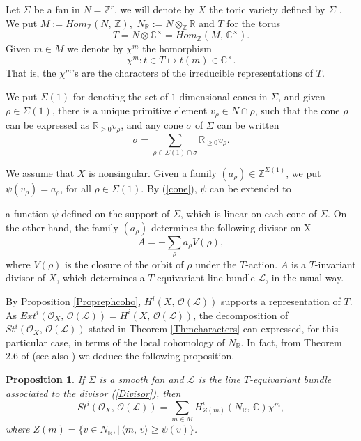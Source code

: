 \documentclass[xypic,amscd,syntonly,amssymb,verbatim,12pt]{amsart}
\theoremstyle{plain}
\newtheorem{Prop}[Thm]{Proposition}
\theoremstyle{definition}
\theoremstyle{remark}
\numberwithin{equation}{section}
\begin{document}
Let $\Sigma$ be a fan in $N={\mathbb Z}^r$, we will denote by $X$
the toric variety defined by $\Sigma$ \cite{C-K,C-L-S,Fulton,Oda}.
We put $M:=Hom_{\mathbb Z}(N,\,{\mathbb Z}),$ $N_{\mathbb
R}:=N\otimes_{\mathbb Z}{\mathbb R}$ and $T$ for the torus
$$T=N\otimes{\mathbb C}^{\times}=Hom_{\mathbb Z}(M,\,{\mathbb
C}^{\times}).$$
  Given $m\in M$ we denote by $\chi^m$ the homorphism
$$\chi^m:t\in T\mapsto t(m)\in {\mathbb C}^{\times}.$$
 That is, the $\chi^m$'s are the characters of the irreducible representations of $T$.

 We put $\Sigma(1)$ for denoting
the set of $1$-dimensional cones in $\Sigma$, and given $\rho\in
\Sigma(1)$, there is a unique primitive element $v_{\rho}\in N\cap
\rho$, such that the cone $\rho$ can be expressed as ${\mathbb
R}_{\geq 0}v_{\rho}$, and any cone $\sigma$ of $\Sigma$ can be
written
 \begin{equation}\label{cone}
 \sigma=\sum_{\rho\in\Sigma(1)\cap\sigma}{\mathbb
R}_{\geq 0}v_{\rho}.
\end{equation}

We assume that $X$ is nonsingular. Given a family $(a_{\rho})\in
{\mathbb Z}^{\Sigma(1)}$, we put $\psi(v_{\rho})=a_{\rho}$, for
all $\rho\in\Sigma(1)$. By (\ref{cone}), $\psi$ can be extended to
 
 
  a  function $\psi$ defined on the
support of $\Sigma$, which is linear on each cone of $\Sigma$. On
the other hand, the family $(a_{\rho})$ determines the following
divisor on X
 \begin{equation}\label{Divisor}
 A=-\sum_{\rho}a_{\rho}V(\rho),
  \end{equation}
where $V({\rho})$ is the closure of the orbit of $\rho$ under the
$T$-action. $A$ is a $T$-invariant divisor of $X$, which
determines a $T$-equivariant line bundle ${\mathcal L}$, in the
usual way.

By Proposition \ref{Proprephcoho},
$H^i(X,\,{\mathcal O}({\mathcal L}))$ supports a representation of
$T$. As $Ext^i({\mathcal O}_X,\,{\mathcal O}({\mathcal L}))=
H^i(X,\,{\mathcal O}({\mathcal L}))$, the decomposition of
$St^i({\mathcal O}_X,\, {\mathcal O}({\mathcal
L}))$
 stated in Theorem
\ref{Thmcharacters} can expressed, for this particular case, in
terms of the local cohomology of $N_{\mathbb R}$. In fact,   from
Theorem 2.6 of \cite{Oda} (see also \cite[page 74]{Fulton}) we
deduce the following proposition.
\begin{Prop}\label{PropToric}
If $\Sigma$ is a smooth fan and ${\mathcal L}$ is the line
$T$-equivariant bundle associated to the divisor (\ref{Divisor}),
then
$$St^i({\mathcal O}_X,\,{\mathcal O}({\mathcal L}))=\sum_{m\in
M}H^i_{Z(m)}(N_{\mathbb R},\,{\mathbb C})\chi^m,$$
 where $Z(m)=\{v\in N_{\mathbb R},|\, \langle m,\,v\rangle\geq
 \psi(v)\}$.
\end{Prop}
\end{document}
